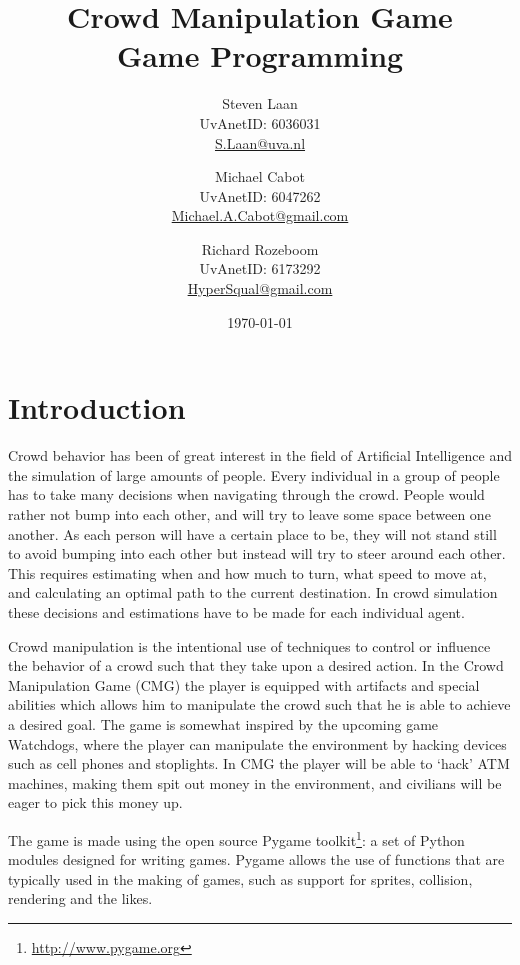 \documentclass[a4paper,pdf,12pt]{article}
\title{Crowd Manipulation Game\\ \normalsize{Game Programming}}
\author{Steven Laan\\UvAnetID: 6036031\\\url{S.Laan@uva.nl} \and Michael Cabot\\UvAnetID: 6047262\\\url{Michael.A.Cabot@gmail.com} \and Richard Rozeboom\\UvAnetID: 6173292\\\url{HyperSqual@gmail.com}}
\date{\today}
\begin{document}
\maketitle
{}

\section{Introduction}
Crowd behavior has been of great interest in the field of Artificial Intelligence and the simulation of large amounts of people. Every individual in a group of people has to take  many decisions when navigating through the crowd. People would rather not bump into each other, and will try to leave some space between one another. As each person will have a certain place to be, they will not stand still to avoid bumping into each other but instead will try to steer around each other. This requires estimating when and how much to turn, what speed to move at, and calculating an optimal path to the current destination. In crowd simulation these decisions and estimations have to be made for each individual agent.

Crowd manipulation is the intentional use of techniques to control or influence the behavior of a crowd such that they take upon a desired action. In the Crowd Manipulation Game (CMG) the player is equipped with artifacts and special abilities which allows him to manipulate the crowd such that he is able to achieve a desired goal. The game is somewhat inspired by the upcoming game Watchdogs\citep{watchdogs}, where the player can manipulate the environment by hacking devices such as cell phones and stoplights. In CMG the player will be able to `hack' ATM machines, making them spit out money in the environment, and civilians will be eager to pick this money up.

The game is made using the open source Pygame toolkit\footnote{\url{http://www.pygame.org}}: a set of Python modules designed for writing games. Pygame allows the use of functions that are typically used in the making of games, such as support for sprites, collision, rendering and the likes. 
\end{document}
